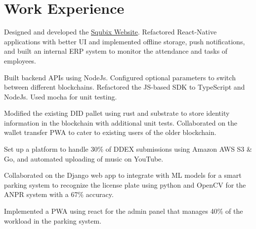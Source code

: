 \documentclass[]{assets/deedy-resume-openfont}
\begin{document}
  \section{Work Experience}
  \hfill {}
      \begin{tightemize}
       \item Designed and developed the {\href{https://squbix.com/}{ \underline{Squbix Website}}}. Refactored React-Native applications with better UI and implemented offline storage, push notifications, and built an internal ERP system to monitor the attendance and tasks of employees.
       \item Built backend APIs using NodeJs. Configured optional parameters to switch between different blockchains. Refactored the JS-based SDK to TypeScript and NodeJs. Used mocha for unit testing.
       \item Modified the existing DID pallet using rust and substrate to store identity information in the blockchain with additional unit tests. Collaborated on the wallet transfer PWA to cater to existing users of the older blockchain.
      \end{tightemize}
      \sectionsep
  \hfill {}
      \begin{tightemize}
    \item Set up a platform to handle 30\% of DDEX submissions using Amazon AWS S3 \& Go, and automated uploading of music on YouTube.
\end{tightemize}
      \sectionsep
  \hfill {}
      \begin{tightemize}
    \item Collaborated on the Django web app to integrate with ML models for a smart parking system to recognize the license plate using python and OpenCV for the ANPR system with a 67\% accuracy.
    \item Implemented a PWA using react for the admin panel that manages 40\% of the workload in the parking system.
\end{tightemize}
      \sectionsep
%
%
\end{document}

